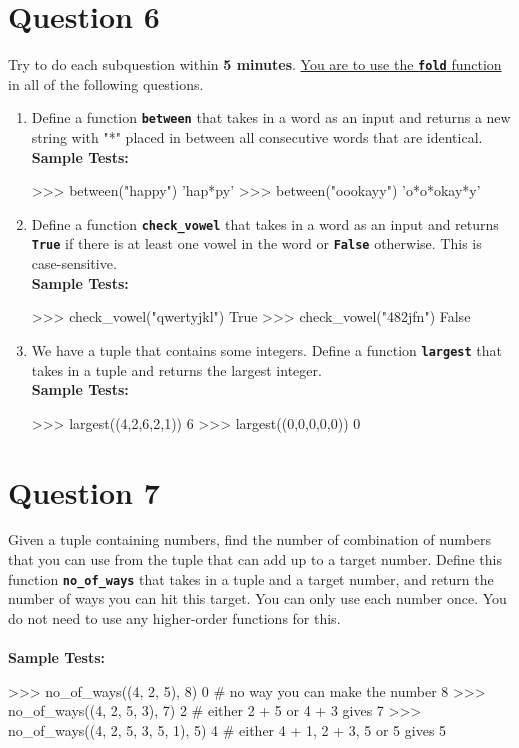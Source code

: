 \section{Question 6}
Try to do each subquestion within \textbf{5 minutes}. \underline{You are to use the \texttt{\bfseries fold}
function} in all of the following questions.
\begin{enumerate}
\item Define a function \texttt{\bfseries between} that takes in a word as an input and returns a new
string with "*" placed in between all consecutive words that are identical. \\
\textbf{Sample Tests:}
\begin{python}
>>> between("happy")
'hap*py'
>>> between("oookayy")
'o*o*okay*y'
\end{python}

\item Define a function \texttt{\bfseries check\_vowel} that takes in a word as an input and returns
\texttt{\bfseries True} if there is at least one vowel in the word or \texttt{\bfseries False} otherwise. This is
case-sensitive. \\
\newpage
\textbf{Sample Tests:}
\begin{python}
>>> check_vowel("qwertyjkl")
True
>>> check_vowel("482jfn")
False
\end{python}

\item We have a tuple that contains some integers. Define a function \texttt{\bfseries largest} that
takes in a tuple and returns the largest integer. \\
\textbf{Sample Tests:}
\begin{python}
>>> largest((4,2,6,2,1))
6
>>> largest((0,0,0,0,0))
0
\end{python}
\end{enumerate}

\section{Question 7}
Given a tuple containing numbers, find the number of combination of numbers that
you can use from the tuple that can add up to a target number. Define this function
\texttt{\bfseries no\_of\_ways} that takes in a tuple and a target number, and return the number of ways
you can hit this target. You can only use each number once. You do not need to use
any higher-order functions for this. \\ \\
\textbf{Sample Tests:}
\begin{python}
>>> no_of_ways((4, 2, 5), 8)
0                               # no way you can make the number 8
>>> no_of_ways((4, 2, 5, 3), 7)
2                               # either 2 + 5 or 4 + 3 gives 7
>>> no_of_ways((4, 2, 5, 3, 5, 1), 5)
4                               # either 4 + 1, 2 + 3, 5 or 5 gives 5
\end{python}

